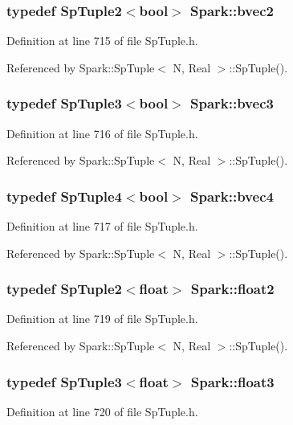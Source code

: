 \subsubsection{\setlength{\rightskip}{0pt plus 5cm}typedef {\bf Sp\-Tuple2}$<$bool$>$ {\bf Spark::bvec2}}\label{namespaceSpark_a13}


Definition at line 715 of file Sp\-Tuple.h.

Referenced by Spark::Sp\-Tuple$<$ N, Real $>$::Sp\-Tuple().
\subsubsection{\setlength{\rightskip}{0pt plus 5cm}typedef {\bf Sp\-Tuple3}$<$bool$>$ {\bf Spark::bvec3}}\label{namespaceSpark_a14}


Definition at line 716 of file Sp\-Tuple.h.

Referenced by Spark::Sp\-Tuple$<$ N, Real $>$::Sp\-Tuple().
\subsubsection{\setlength{\rightskip}{0pt plus 5cm}typedef {\bf Sp\-Tuple4}$<$bool$>$ {\bf Spark::bvec4}}\label{namespaceSpark_a15}


Definition at line 717 of file Sp\-Tuple.h.

Referenced by Spark::Sp\-Tuple$<$ N, Real $>$::Sp\-Tuple().
\subsubsection{\setlength{\rightskip}{0pt plus 5cm}typedef {\bf Sp\-Tuple2}$<$float$>$ {\bf Spark::float2}}\label{namespaceSpark_a16}


Definition at line 719 of file Sp\-Tuple.h.

Referenced by Spark::Sp\-Tuple$<$ N, Real $>$::Sp\-Tuple().
\subsubsection{\setlength{\rightskip}{0pt plus 5cm}typedef {\bf Sp\-Tuple3}$<$float$>$ {\bf Spark::float3}}\label{namespaceSpark_a17}


Definition at line 720 of file Sp\-Tuple.h.

